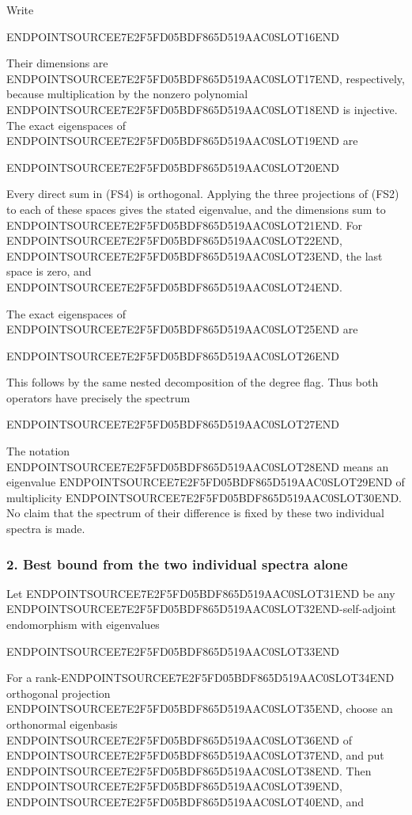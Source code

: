 Write

ENDPOINTSOURCEE7E2F5FD05BDF865D519AAC0SLOT16END

Their dimensions are ENDPOINTSOURCEE7E2F5FD05BDF865D519AAC0SLOT17END, respectively, because multiplication by the nonzero polynomial ENDPOINTSOURCEE7E2F5FD05BDF865D519AAC0SLOT18END is injective. The exact eigenspaces of ENDPOINTSOURCEE7E2F5FD05BDF865D519AAC0SLOT19END are

ENDPOINTSOURCEE7E2F5FD05BDF865D519AAC0SLOT20END

Every direct sum in (FS4) is orthogonal. Applying the three projections of (FS2) to each of these spaces gives the stated eigenvalue, and the dimensions sum to ENDPOINTSOURCEE7E2F5FD05BDF865D519AAC0SLOT21END. For ENDPOINTSOURCEE7E2F5FD05BDF865D519AAC0SLOT22END, ENDPOINTSOURCEE7E2F5FD05BDF865D519AAC0SLOT23END, the last space is zero, and ENDPOINTSOURCEE7E2F5FD05BDF865D519AAC0SLOT24END.

The exact eigenspaces of ENDPOINTSOURCEE7E2F5FD05BDF865D519AAC0SLOT25END are

ENDPOINTSOURCEE7E2F5FD05BDF865D519AAC0SLOT26END

This follows by the same nested decomposition of the degree flag. Thus both operators have precisely the spectrum

ENDPOINTSOURCEE7E2F5FD05BDF865D519AAC0SLOT27END

The notation ENDPOINTSOURCEE7E2F5FD05BDF865D519AAC0SLOT28END means an eigenvalue ENDPOINTSOURCEE7E2F5FD05BDF865D519AAC0SLOT29END of multiplicity ENDPOINTSOURCEE7E2F5FD05BDF865D519AAC0SLOT30END. No claim that the spectrum of their difference is fixed by these two individual spectra is made.

\subsubsection{2. Best bound from the two individual spectra alone}\label{endpoint-four_window_sharpness--best-bound-from-the-two-individual-spectra-alone}

Let ENDPOINTSOURCEE7E2F5FD05BDF865D519AAC0SLOT31END be any ENDPOINTSOURCEE7E2F5FD05BDF865D519AAC0SLOT32END-self-adjoint endomorphism with eigenvalues

ENDPOINTSOURCEE7E2F5FD05BDF865D519AAC0SLOT33END

For a rank-ENDPOINTSOURCEE7E2F5FD05BDF865D519AAC0SLOT34END orthogonal projection ENDPOINTSOURCEE7E2F5FD05BDF865D519AAC0SLOT35END, choose an orthonormal eigenbasis ENDPOINTSOURCEE7E2F5FD05BDF865D519AAC0SLOT36END of ENDPOINTSOURCEE7E2F5FD05BDF865D519AAC0SLOT37END, and put ENDPOINTSOURCEE7E2F5FD05BDF865D519AAC0SLOT38END. Then ENDPOINTSOURCEE7E2F5FD05BDF865D519AAC0SLOT39END, ENDPOINTSOURCEE7E2F5FD05BDF865D519AAC0SLOT40END, and

